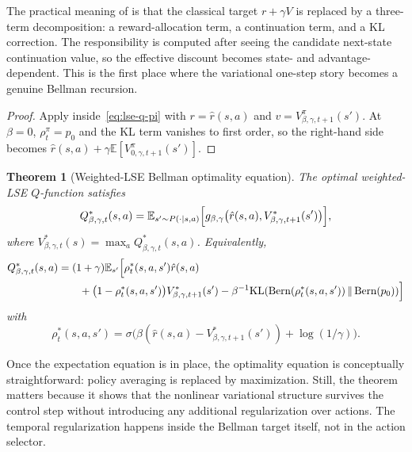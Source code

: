 \documentclass{article}
\newtheorem{theorem}{Theorem}[section]
\theoremstyle{remark}
\DeclareMathOperator{\Bern}{Bern}
\newcommand{\E}{\mathbb{E}}
\newcommand{\KL}{\mathrm{KL}}
\newcommand{\gbg}{g_{\beta,\gamma}}
\newcommand{\pprior}{p_0}
\newcommand{\KLbin}[2]{\KL\!\left(\Bern(#1)\,\middle\|\,\Bern(#2)\right)}
\begin{document}
The practical meaning of  is that the classical target $r+\gamma V$ is replaced by a three-term decomposition: a reward-allocation term, a continuation term, and a KL correction.
The responsibility is computed after seeing the candidate next-state continuation value, so the effective discount becomes state- and advantage-dependent.
This is the first place where the variational one-step story becomes a genuine Bellman recursion.

\begin{proof}
Apply  inside~\eqref{eq:lse-q-pi} with $r=\hat r(s,a)$ and $v=V_{\beta,\gamma,t+1}^\pi(s')$.
At $\beta=0$, $\rho_t^{\pi}=\pprior$ and the KL term vanishes to first order, so the right-hand side becomes $\hat r(s,a)+\gamma\E[V_{0,\gamma,t+1}^\pi(s')]$.
\end{proof}

\begin{theorem}[Weighted-LSE Bellman optimality equation]
\label{thm:lse-bellman-optimality}
The optimal weighted-LSE $Q$-function satisfies
\begin{equation}
Q^*_{\beta,\gamma,t}(s,a)
=
\E_{s'\sim P(\cdot\mid s,a)}\Bigl[\gbg\bigl(\hat r(s,a),V^*_{\beta,\gamma,t+1}(s')\bigr)\Bigr],
\label{eq:lse-bellman-opt}
\end{equation}
where $V^*_{\beta,\gamma,t}(s)=\max_a Q^*_{\beta,\gamma,t}(s,a)$.
Equivalently,
\begin{equation}
\begin{aligned}
Q^*_{\beta,\gamma,t}(s,a)
&=
(1+\gamma)
\E_{s'}\Bigl[
\rho_t^*(s,a,s')\hat r(s,a) \\
&\qquad+\bigl(1-\rho_t^*(s,a,s')\bigr)V^*_{\beta,\gamma,t+1}(s')
- \beta^{-1}\KLbin{\rho_t^*(s,a,s')}{\pprior}
\Bigr]
\end{aligned}
\label{eq:lse-bellman-opt-expanded}
\end{equation}
with
\[
\rho_t^*(s,a,s') = \sigma\!\bigl(\beta(\hat r(s,a)-V^*_{\beta,\gamma,t+1}(s'))+\log(1/\gamma)\bigr).
\]
\end{theorem}

Once the expectation equation is in place, the optimality equation is conceptually straightforward: policy averaging is replaced by maximization.
Still, the theorem matters because it shows that the nonlinear variational structure survives the control step without introducing any additional regularization over actions.
The temporal regularization happens inside the Bellman target itself, not in the action selector.
\end{document}
